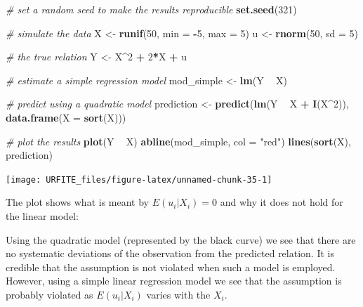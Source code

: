 \documentclass[]{book}
\newenvironment{Shaded}{\begin{snugshade}}{\end{snugshade}}
\newcommand{\KeywordTok}[1]{\textcolor[rgb]{0.13,0.29,0.53}{\textbf{#1}}}
\newcommand{\DataTypeTok}[1]{\textcolor[rgb]{0.13,0.29,0.53}{#1}}
\newcommand{\DecValTok}[1]{\textcolor[rgb]{0.00,0.00,0.81}{#1}}
\newcommand{\StringTok}[1]{\textcolor[rgb]{0.31,0.60,0.02}{#1}}
\newcommand{\CommentTok}[1]{\textcolor[rgb]{0.56,0.35,0.01}{\textit{#1}}}
\newcommand{\OperatorTok}[1]{\textcolor[rgb]{0.81,0.36,0.00}{\textbf{#1}}}
\newcommand{\NormalTok}[1]{#1}
\theoremstyle{definition}
\theoremstyle{definition}
\theoremstyle{definition}
\theoremstyle{remark}
\begin{document}
\begin{Shaded}
\begin{Highlighting}[]
\CommentTok{# set a random seed to make the results reproducible}
\KeywordTok{set.seed}\NormalTok{(}\DecValTok{321}\NormalTok{)}

\CommentTok{# simulate the data }
\NormalTok{X <-}\StringTok{ }\KeywordTok{runif}\NormalTok{(}\DecValTok{50}\NormalTok{, }\DataTypeTok{min =} \OperatorTok{-}\DecValTok{5}\NormalTok{, }\DataTypeTok{max =} \DecValTok{5}\NormalTok{)}
\NormalTok{u <-}\StringTok{ }\KeywordTok{rnorm}\NormalTok{(}\DecValTok{50}\NormalTok{, }\DataTypeTok{sd =} \DecValTok{5}\NormalTok{)  }

\CommentTok{# the true relation  }
\NormalTok{Y <-}\StringTok{ }\NormalTok{X}\OperatorTok{^}\DecValTok{2} \OperatorTok{+}\StringTok{ }\DecValTok{2}\OperatorTok{*}\NormalTok{X }\OperatorTok{+}\StringTok{ }\NormalTok{u                }

\CommentTok{# estimate a simple regression model }
\NormalTok{mod_simple <-}\StringTok{ }\KeywordTok{lm}\NormalTok{(Y }\OperatorTok{~}\StringTok{ }\NormalTok{X)}

\CommentTok{# predict using a quadratic model }
\NormalTok{prediction <-}\StringTok{ }\KeywordTok{predict}\NormalTok{(}\KeywordTok{lm}\NormalTok{(Y }\OperatorTok{~}\StringTok{ }\NormalTok{X }\OperatorTok{+}\StringTok{  }\KeywordTok{I}\NormalTok{(X}\OperatorTok{^}\DecValTok{2}\NormalTok{)), }\KeywordTok{data.frame}\NormalTok{(}\DataTypeTok{X =} \KeywordTok{sort}\NormalTok{(X)))}

\CommentTok{# plot the results}
\KeywordTok{plot}\NormalTok{(Y }\OperatorTok{~}\StringTok{ }\NormalTok{X)}
\KeywordTok{abline}\NormalTok{(mod_simple, }\DataTypeTok{col =} \StringTok{"red"}\NormalTok{)}
\KeywordTok{lines}\NormalTok{(}\KeywordTok{sort}\NormalTok{(X), prediction)}
\end{Highlighting}
\end{Shaded}

\begin{center}\texttt{[image: URFITE\_files/figure-latex/unnamed-chunk-35-1]} \end{center}

The plot shows what is meant by \(E(u_i|X_i) = 0\) and why it does not
hold for the linear model:

Using the quadratic model (represented by the black curve) we see that
there are no systematic deviations of the observation from the predicted
relation. It is credible that the assumption is not violated when such a
model is employed. However, using a simple linear regression model we
see that the assumption is probably violated as \(E(u_i|X_i)\) varies
with the \(X_i\).
\end{document}
